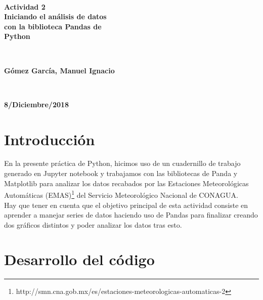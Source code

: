 \documentclass[12pt]{article}
\begin{document}
\begin{titlepage}
\HRule \\

{\huge \bfseries
Actividad 2\\
Iniciando el análisis de datos\\
con la biblioteca Pandas de\\
Python\\}

 \HRule \\[1cm]


\vfill

\begin{minipage}{0.6\textwidth}
	\raggedright
	{\large \textbf{Gómez García, Manuel Ignacio}}
\end{minipage}
~
\begin{minipage}{0.35\textwidth}
	\raggedleft
	{\large \textbf{8/Diciembre/2018}}
\end{minipage}

\end{titlepage}

\section{Introducción}

\noindent En la presente práctica de Python, hicimos uso de un cuadernillo de trabajo generado en Jupyter notebook y trabajamos con las bibliotecas de Panda y Matplotlib para analizar los datos recabados por las Estaciones Meteorológicas Automáticas (EMAS)\footnote{http://smn.cna.gob.mx/es/estaciones-meteorologicas-automaticas-2} del Servicio Meteorológico Nacional de CONAGUA. \\
\indent Hay que tener en cuenta que el objetivo principal de esta actividad consiste en aprender a manejar series de datos haciendo uso de Pandas para finalizar creando dos gráficos distintos y poder analizar los datos tras esto.

\section{Desarrollo del código}
\end{document}
